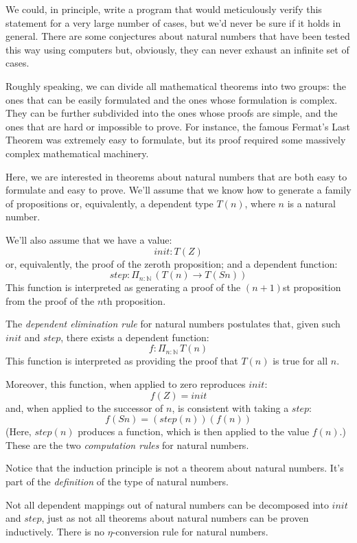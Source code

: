 \documentclass[DaoFP]{subfiles}
\begin{document}
We could, in principle, write a program that would meticulously verify this statement for a very large number of cases, but we'd never be sure if it holds in general. There are some conjectures about natural numbers that have been tested this way using computers but, obviously, they can never exhaust an infinite set of cases.

Roughly speaking, we can divide all mathematical theorems into two groups: the ones that can be easily formulated and the ones whose formulation is complex. They can be further subdivided into the ones whose proofs are simple, and the ones that are hard or impossible to prove. For instance, the famous Fermat's Last Theorem was extremely easy to formulate, but its proof required some massively complex mathematical machinery. 

Here, we are interested in theorems about natural numbers that are both easy to formulate and easy to prove. We'll assume that we know how to generate a family of propositions or, equivalently, a dependent type $T(n)$, where $n$ is a natural number. 

We'll also assume that we have a value:
\[\mathit{init} \colon T(Z) \]
or, equivalently, the proof of the zeroth proposition; and a dependent function:
\[\mathit{step} \colon \Pi_{n:\mathbb{N}}\,\left(T(n) \to T(S n)\right) \]
This function is interpreted as generating a proof of the $(n + 1)$st proposition from the proof of the $n$th proposition.

The \emph{dependent elimination rule} for natural numbers postulates that, given such $\mathit{init}$ and $\mathit{step}$, there exists a dependent function:
\[f \colon \Pi_{n:\mathbb{N}} \, T(n) \]
This function is interpreted as providing the proof that $T(n)$ is true for all $n$.

Moreover, this function, when applied to zero reproduces $\mathit{init}$:
\[ f (Z) = \mathit{init} \]
and, when applied to the successor of $n$, is consistent with taking a $\mathit{step}$:
\[ f (S n) = (\mathit{step} (n)) (f (n)) \]
(Here, $\mathit{step}(n)$ produces a function, which is then applied to the value $f(n)$.) These are the two \emph{computation rules} for natural numbers. 

Notice that the induction principle is not a theorem about natural numbers. It's part of the \emph{definition} of the type of natural numbers. 

Not all dependent mappings out of natural numbers can be decomposed into $\mathit{init}$ and $\mathit{step}$, just as not all theorems about natural numbers can be proven inductively. There is no $\eta$-conversion rule for natural numbers.
\end{document}
